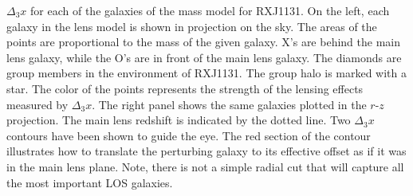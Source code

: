 \label{fig:fieldrz} $\Delta_3x$ for each of the galaxies of the mass model for RXJ1131. On the left, each galaxy in the lens model is shown in projection on the sky. The areas of the points are proportional to the mass of the given galaxy. X's are behind the main lens galaxy, while the O's are in front of the main lens galaxy. The diamonds are group members in the environment of RXJ1131. The group halo is marked with a star. The color of the points represents the strength of the lensing effects measured by $\Delta_3 x$. The right panel shows the same galaxies plotted in the $r$-$z$ projection. The main lens redshift is indicated by the dotted line. Two $\Delta_3 x$ contours have been shown to guide the eye. The red section of the contour illustrates how to translate the perturbing galaxy to its effective offset as if it was in the main lens plane. Note, there is not a simple radial cut that will capture all the most important LOS galaxies.